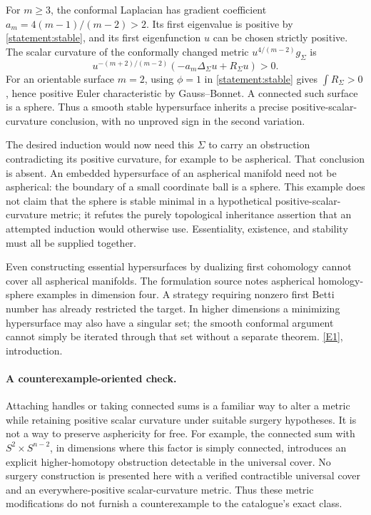 \documentclass[11pt,a4paper]{article}
\newcommand{\eref}[2]{\hyperlink{extra:#1:#2}{[E#2]}}
\numberwithin{equation}{section}
\begin{document}
For $m\geq3$, the conformal Laplacian has gradient coefficient
$a_m=4(m-1)/(m-2)>2$.  Its first eigenvalue is positive by
\eqref{statement:stable}, and its first eigenfunction $u$ can be chosen
strictly positive.  The scalar curvature of the conformally changed
metric $u^{4/(m-2)}g_\Sigma$ is
\[
 u^{-(m+2)/(m-2)}(-a_m\Delta_\Sigma u+R_\Sigma u)>0.
\]
For an orientable surface $m=2$, using $\phi=1$ in
\eqref{statement:stable} gives $\int R_\Sigma>0$, hence positive Euler
characteristic by Gauss--Bonnet.  A connected such surface is a sphere.
Thus a smooth stable hypersurface inherits a precise positive-scalar-
curvature conclusion, with no unproved sign in the second variation.

The desired induction would now need this $\Sigma$ to carry an
obstruction contradicting its positive curvature, for example to be
aspherical.  That conclusion is absent.  An embedded hypersurface of
an aspherical manifold need not be aspherical: the boundary of a small
coordinate ball is a sphere.  This example does not claim that the
sphere is stable minimal in a hypothetical positive-scalar-curvature
metric; it refutes the purely topological inheritance assertion that
an attempted induction would otherwise use.  Essentiality, existence,
and stability must all be supplied together.

Even constructing essential hypersurfaces by dualizing first cohomology
cannot cover all aspherical manifolds.  The formulation source notes
aspherical homology-sphere examples in dimension four.  A strategy
requiring nonzero first Betti number has already restricted the target.
In higher dimensions a minimizing hypersurface may also have a singular
set; the smooth conformal argument cannot simply be iterated through
that set without a separate theorem. \eref{statement}{1}, introduction.

\paragraph{A counterexample-oriented check.}
Attaching handles or taking connected sums is a familiar way to alter
a metric while retaining positive scalar curvature under suitable
surgery hypotheses.  It is not a way to preserve asphericity for free.
For example, the connected sum with $S^2\times S^{n-2}$, in dimensions
where this factor is simply connected, introduces an explicit
higher-homotopy obstruction detectable in the universal cover.
No surgery construction is presented here with a verified contractible
universal cover and an everywhere-positive scalar-curvature metric.
Thus these metric modifications do not furnish a counterexample to the
catalogue's exact class.
\end{document}
